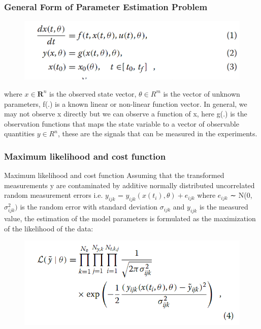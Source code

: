 \documentclass[11pt]{article}
\makeatletter
\def\maxwidth{\ifdim\Gin@nat@width>\linewidth\linewidth
    \else\Gin@nat@width\fi}
\let\Oldincludegraphics\includegraphics
\renewcommand{\includegraphics}[1]{\Oldincludegraphics[width=.8\maxwidth]{#1}}
\makeatother
\begin{document}
\subsubsection{General Form of Parameter Estimation
Problem}\label{general-form-of-parameter-estimation-problem}

\begin{figure}[htbp]
\centering
\includegraphics{images/General_Parameter_Estimation_Form.png}
\caption{}
\end{figure}

where \(x \in \mathbf{R}^{n}\) is the observed state vector,
\(\theta \in {R}^{m}\) is the vector of unknown parameters, f(.) is a
known linear or non-linear function vector. In general, we may not
observe x directly but we can observe a function of x, here g(.) is the
observation functions that maps the state variable to a vector of
observable quantities \(y \in {R}^{n}\), these are the signals that can
be measured in the experiments.

\subsubsection{Maximum likelihood and cost
function}\label{maximum-likelihood-and-cost-function}

Maximum likelihood and cost function Assuming that the transformed
measurements y are contaminated by additive normally distributed
uncorrelated random measurement errors i.e. \(y_{ijk}\) =
\(y_{ijk}(x(t_{i}), θ) + e_{ijk}\) where \(e_{ijk}\) ∼ N(0,
\(σ^{2}_{ijk})\) is the random error with standard deviation \(σ_{ijk}\)
and \(y_{ijk}\) is the measured value, the estimation of the model
parameters is formulated as the maximization of the likelihood of the
data:

\begin{figure}[htbp]
\centering
\includegraphics{images/Maximum_Likelihood.png}
\caption{}
\end{figure}
\end{document}

